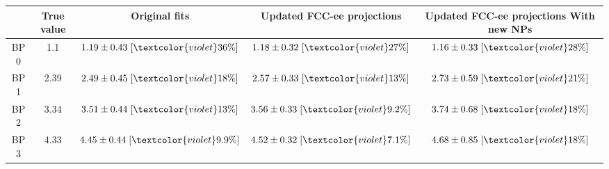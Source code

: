 \begin{tabular}{c||c|c|c|c|}
 & True value & Original fits & Updated FCC-ee projections & Updated FCC-ee projections
With new NPs\\
\hline\hline
BP 0 & 1.1 & $1.19\pm0.43\;[\textcolor{violet}{36\%}]$ & $1.18\pm0.32\;[\textcolor{violet}{27\%}]$ & $1.16\pm0.33\;[\textcolor{violet}{28\%}]$\\\hline
BP 1 & 2.39 & $2.49\pm0.45\;[\textcolor{violet}{18\%}]$ & $2.57\pm0.33\;[\textcolor{violet}{13\%}]$ & $2.73\pm0.59\;[\textcolor{violet}{21\%}]$\\\hline
BP 2 & 3.34 & $3.51\pm0.44\;[\textcolor{violet}{13\%}]$ & $3.56\pm0.33\;[\textcolor{violet}{9.2\%}]$ & $3.74\pm0.68\;[\textcolor{violet}{18\%}]$\\\hline
BP 3 & 4.33 & $4.45\pm0.44\;[\textcolor{violet}{9.9\%}]$ & $4.52\pm0.32\;[\textcolor{violet}{7.1\%}]$ & $4.68\pm0.85\;[\textcolor{violet}{18\%}]$\\
\end{tabular}
